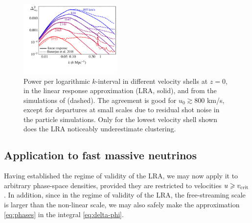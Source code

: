\documentclass[useAMS, usenatbib]{mnras}
\begin{document}
\begin{figure}
  \includegraphics[width=0.45\textwidth]{nuplots/banerjee_lin_resp.pdf}
  \caption{Power per logarithmic $k$-interval in different velocity shells at $z = 0$, in the linear response approximation (LRA, solid), and from the simulations of \protect \cite{Banerjee_2018} (dashed). The agreement is good for $u_0 \gtrsim 800$ km/s, except for departures at small scales due to residual shot noise in the particle simulations. Only for the lowest velocity shell shown does the LRA noticeably underestimate clustering.
  }
  \label{fig:simvshell}
\end{figure}


\subsection{Application to fast massive neutrinos}

Having established the regime of validity of the LRA, we may now apply it to arbitrary phase-space densities, provided they are restricted to velocities $u \geq v_{\rm crit}$. In addition, since in the regime of validity of the LRA, the free-streaming scale is larger than the non-linear scale, we may also safely make the approximation \eqref{eq:phases} in the integral \eqref{eq:delta-phi}.
\end{document}
